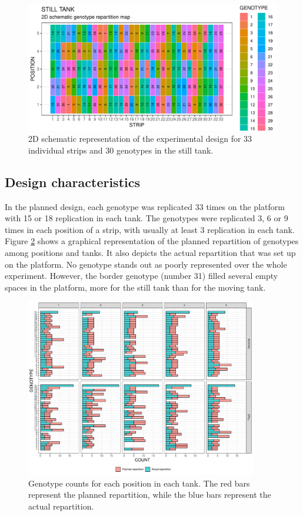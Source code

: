 \begin{figure}
    \includegraphics[width=\textwidth]{../../Figures/design_layout_still.pdf} 
    \caption{2D schematic representation of the experimental design for 33 individual strips and 30 genotypes in the still 
    tank.}
    \label{fig:still_layout_30_geno}
\end{figure}

\subsection{Design characteristics}
In the planned design, each genotype was replicated 33 times on the platform with 15 or 18 replication in each tank.
The genotypes were replicated 3, 6 or 9 times in each position of a strip, with usually at least 3 replication in each tank.
Figure \ref{fig:geno_repartition_plot} shows a graphical representation of the planned repartition of genotypes among positions and tanks. It also depicts the actual repartition that was set up on the platform. No genotype stands out as poorly represented over the whole experiment. However, the border genotype (number 31) filled several empty spaces in the platform, more for the still tank than for the moving tank.
\begin{figure}
\centering
\includegraphics[width = 0.9\textwidth]{../../Figures/repartition_plot.pdf}
\caption[Genotype counts for each position in each tank]{Genotype counts for each position in each tank. The red bars represent the planned repartition, while the blue bars represent the actual repartition.}
\label{fig:geno_repartition_plot}
\end{figure}


